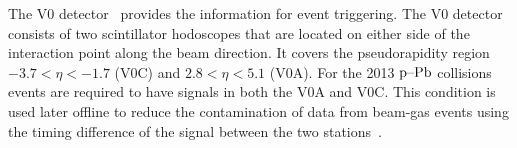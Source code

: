 The V0 detector~\cite{forwarddetectorsTdr} provides the information for event triggering. The V0 detector consists of two scintillator hodoscopes that are located on either side of the interaction point along the beam direction. It covers the pseudorapidity region $-3.7 < \eta < -1.7$ (V0C) and $2.8 < \eta < 5.1$ (V0A). For the 2013 $\mbox{p--Pb}$ collisions events are required to have signals in both the V0A and V0C. This condition is used later offline to reduce the contamination of data from beam-gas events using the timing difference of the signal between the two stations~\cite{alicePerformance}.



